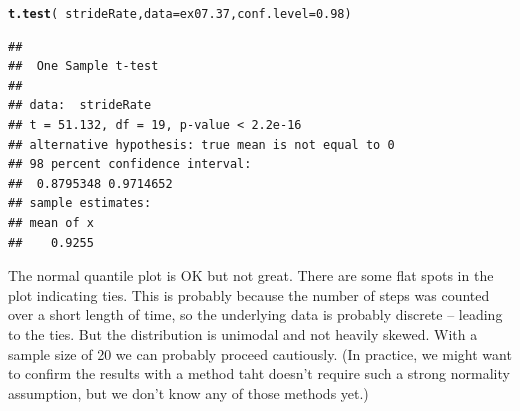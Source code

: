 \documentclass[twoside]{book}\usepackage[]{graphicx}\usepackage[]{xcolor}
\makeatletter
\newcommand{\hlnum}[1]{\textcolor[rgb]{0.686,0.059,0.569}{#1}}%
\newcommand{\hlopt}[1]{\textcolor[rgb]{0,0,0}{#1}}%
\newcommand{\hlstd}[1]{\textcolor[rgb]{0.345,0.345,0.345}{#1}}%
\newcommand{\hlkwc}[1]{\textcolor[rgb]{0.333,0.667,0.333}{#1}}%
\newcommand{\hlkwd}[1]{\textcolor[rgb]{0.737,0.353,0.396}{\textbf{#1}}}%
\newenvironment{kframe}{%
 \def\at@end@of@kframe{}%
 \ifinner\ifhmode%
  \def\at@end@of@kframe{\end{minipage}}%
  \begin{minipage}{\columnwidth}%
 \fi\fi%
 \def\FrameCommand##1{\hskip\@totalleftmargin \hskip-\fboxsep
 \colorbox{shadecolor}{##1}\hskip-\fboxsep
     \hskip-\linewidth \hskip-\@totalleftmargin \hskip\columnwidth}%
 \MakeFramed {\advance\hsize-\width
   \@totalleftmargin\z@ \linewidth\hsize
   \@setminipage}}%
 {\par\unskip\endMakeFramed%
 \at@end@of@kframe}
\newenvironment{knitrout}{}{} %
\makeatother
\begin{document}
\begin{solution}
\begin{knitrout}
\color{fgcolor}\begin{kframe}
\begin{alltt}
\hlkwd{t.test}\hlstd{(} \hlopt{~} \hlstd{strideRate,} \hlkwc{data}\hlstd{=ex07.37,} \hlkwc{conf.level}\hlstd{=}\hlnum{0.98} \hlstd{)}
\end{alltt}
\begin{verbatim}
## 
## 	One Sample t-test
## 
## data:  strideRate
## t = 51.132, df = 19, p-value < 2.2e-16
## alternative hypothesis: true mean is not equal to 0
## 98 percent confidence interval:
##  0.8795348 0.9714652
## sample estimates:
## mean of x 
##    0.9255
\end{verbatim}
\end{kframe}
\end{knitrout}
	The normal quantile plot is OK but not great.  There are some flat spots in
	the plot indicating ties.  This is probably because the number of steps was
	counted over a short length of time, so the underlying data is probably
	discrete -- leading to the ties.  But the distribution is unimodal and 
	not heavily skewed.  With a sample size of 20 we can probably proceed 
	cautiously.  (In practice, we might want to confirm the results with a method
	taht doesn't require such a strong normality assumption, but we don't know
	any of those methods yet.)
\end{solution}
\end{document}
